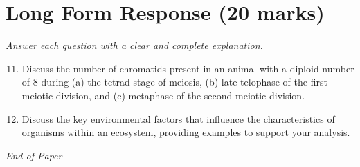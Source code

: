 \documentclass[12pt]{article}
\begin{document}
\section*{Long Form Response (20 marks)}
\textit{Answer each question with a clear and complete explanation.}
\begin{enumerate}[label=\arabic*.]
\setcounter{enumi}{10}
\item Discuss the number of chromatids present in an animal with a diploid number of 8 during (a) the tetrad stage of meiosis, (b) late telophase of the first meiotic division, and (c) metaphase of the second meiotic division.
\item Discuss the key environmental factors that influence the characteristics of organisms within an ecosystem, providing examples to support your analysis.
\end{enumerate}

\vfill
\noindent\textit{End of Paper}
\end{document}
